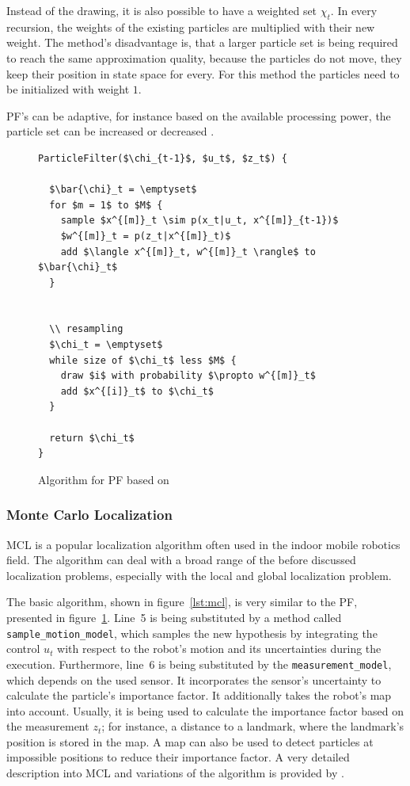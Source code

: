  Instead of the drawing, it is also possible to have a weighted set $\chi_t$. In every recursion, the weights of the existing particles are multiplied with their new weight. The method's disadvantage is, that a larger particle set is being required to reach the same approximation quality, because the particles do not move, they keep their position in state space for every. For this method the particles need to be initialized with weight $1$.
 
\acs{PF}'s can be adaptive, for instance based on the available processing power, the particle set can be increased or decreased \citep{thrun:prob_robo}.

\begin{figure}
\begin{lstlisting}[mathescape]
ParticleFilter($\chi_{t-1}$, $u_t$, $z_t$) {

  $\bar{\chi}_t = \emptyset$
  for $m = 1$ to $M$ {
    sample $x^{[m]}_t \sim p(x_t|u_t, x^{[m]}_{t-1})$
    $w^{[m]}_t = p(z_t|x^{[m]}_t)$
    add $\langle x^{[m]}_t, w^{[m]}_t \rangle$ to $\bar{\chi}_t$
  }
  
  
  \\ resampling
  $\chi_t = \emptyset$
  while size of $\chi_t$ less $M$ {
    draw $i$ with probability $\propto w^{[m]}_t$
    add $x^{[i]}_t$ to $\chi_t$
  }
  
  return $\chi_t$
}
\end{lstlisting}
\caption{Algorithm for \acl{PF} based on \citet{thrun:prob_robo}}
\label{lst:pf}
\end{figure}

\subsubsection*{Monte Carlo Localization}\label{sec:fund_mcl}
\ac{MCL} is a popular localization algorithm often used in the indoor mobile robotics field. The algorithm can deal with a broad range of the before discussed localization problems, especially with the local and global localization problem.

The basic algorithm, shown in figure~\ref{lst:mcl}, is very similar to the \acs{PF}, presented in figure~\ref{lst:pf}. Line~5 is being substituted by a method called \texttt{sample\_motion\_model}, which samples the new hypothesis by integrating the control $u_t$ with respect to the robot's motion and its uncertainties during the execution. Furthermore, line~6 is being substituted by the \texttt{measurement\_model}, which depends on the used sensor. It incorporates the sensor's uncertainty to calculate the particle's importance factor. It additionally takes the robot's map into account. Usually, it is being used to calculate the importance factor based on the measurement $z_t$; for instance, a distance to a landmark, where the landmark's position is stored in the map. A map can also be used to detect particles at impossible positions to reduce their importance factor. A very detailed description into \acl{MCL} and variations of the algorithm is provided by \citet{thrun:prob_robo}.

